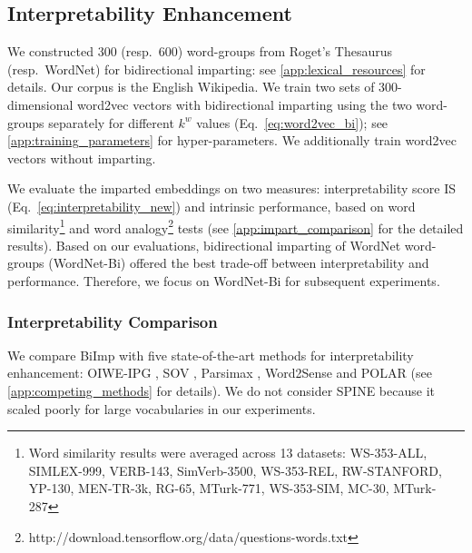 \documentclass[11pt,a4paper]{article}
\def\proposedmethod{BiImp}
\begin{document}
\subsection{Interpretability Enhancement}

We constructed 300 (resp.\ 600) word-groups from Roget's
Thesaurus (resp.\ WordNet) for bidirectional imparting: see \ref{app:lexical_resources} for details. 
Our corpus is the English Wikipedia.
We train two sets of 300-dimensional word2vec vectors with bidirectional imparting using
the two word-groups separately for
different $k^w$ values (Eq.\ 
\ref{eq:word2vec_bi}); see \ref{app:training_parameters} for hyper-parameters. We additionally train word2vec vectors without imparting.

We evaluate the  imparted embeddings
on two measures: 
interpretability score IS (Eq.\
\eqref{eq:interpretability_new}) and intrinsic performance,
based on word similarity\footnote{Word similarity results
  were averaged across 13 datasets: WS-353-ALL, SIMLEX-999,
  VERB-143, SimVerb-3500, WS-353-REL, RW-STANFORD, YP-130,
  MEN-TR-3k, RG-65, MTurk-771, WS-353-SIM, MC-30, MTurk-287}
\citep{faruqui14communityEval} and word
analogy\footnote{http://download.tensorflow.org/data/questions-words.txt}
\citep{mikolov13word2vec_b} tests (see
\ref{app:impart_comparison} for the detailed results). Based
on our evaluations, bidirectional imparting of WordNet
word-groups (WordNet-Bi) offered the best trade-off between
interpretability and performance. Therefore, we focus on
WordNet-Bi for subsequent experiments.



\subsubsection{Interpretability Comparison}
We compare \proposedmethod{}
with five state-of-the-art methods for interpretability
enhancement: OIWE-IPG \citep{luo15online}, SOV
\citep{faruqui15sparse}, Parsimax \citep{park17rotated},
Word2Sense \citep{panigrahi19word2sense} and POLAR
\citep{mathew20polar} (see \ref{app:competing_methods} for
details).
We do not consider
SPINE \citep{subramanian18spine}  because it scaled poorly
for large vocabularies in our experiments.
\end{document}
